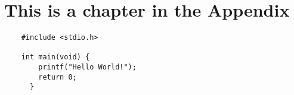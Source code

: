 \chapter{This is a chapter in the Appendix}
\begin{verbatim}
	#include <stdio.h>
	
	int main(void) {
	    printf("Hello World!");
	    return 0;
	  }
	\end{verbatim}
